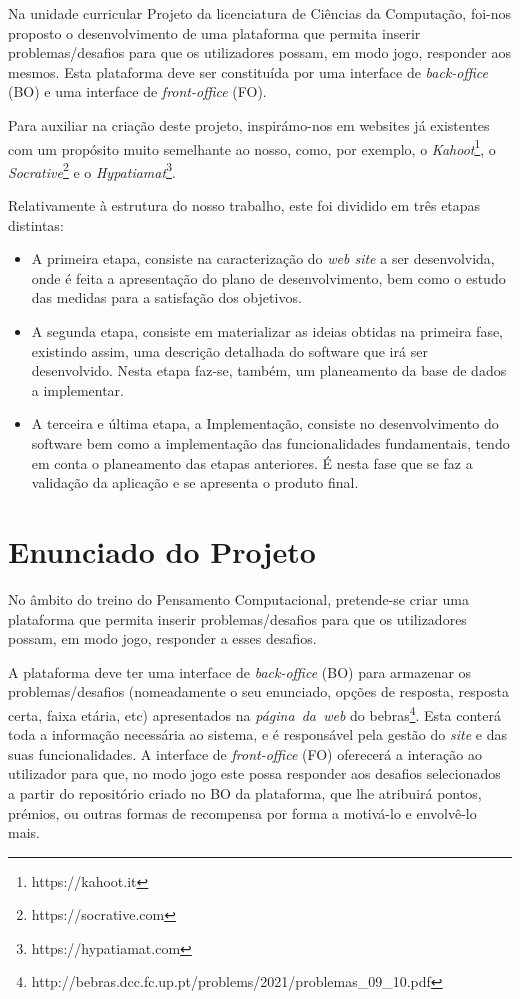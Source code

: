 \documentclass[11pt,a4paper]{report}
\begin{document}
Na unidade curricular Projeto da licenciatura de Ciências da Computação, foi-nos proposto o desenvolvimento de uma plataforma que permita inserir problemas/desafios para que os utilizadores possam, em modo jogo, responder aos mesmos. Esta plataforma deve ser constituída por uma interface de \emph{back-office} (BO) e uma interface de \emph{front-office} (FO).

Para auxiliar na criação deste projeto, inspirámo-nos em websites já existentes com um propósito muito semelhante ao nosso, como, por exemplo, o \emph{Kahoot}\footnote{https://kahoot.it}, o \emph{Socrative}\footnote{https://socrative.com} e o \emph{Hypatiamat}\footnote{https://hypatiamat.com}.

Relativamente à estrutura do nosso trabalho, este foi dividido em três etapas distintas:
\begin{itemize}
   \item A primeira etapa, consiste na caracterização do \emph{web site} a ser desenvolvida, onde é feita a apresentação do plano de desenvolvimento, bem como o estudo das medidas para a satisfação dos objetivos.
   \item A segunda etapa, consiste em materializar as ideias obtidas na primeira fase, existindo assim, uma descrição detalhada do software que irá ser desenvolvido. Nesta etapa faz-se, também, um planeamento da base de dados a implementar.
   \item A terceira e última etapa, a Implementação, consiste no desenvolvimento do software bem como a implementação das funcionalidades fundamentais, tendo em conta o planeamento das etapas anteriores. É nesta fase que se faz a validação da aplicação e se apresenta o produto final.
\end{itemize}

\chapter{Enunciado do Projeto}

No âmbito do treino do Pensamento Computacional, pretende-se criar uma plataforma que permita inserir problemas/desafios para que os utilizadores possam, em modo jogo, responder a esses desafios. 

A plataforma deve ter uma interface de \emph{back-office} (BO) para armazenar os problemas/desafios (nomeadamente o seu enunciado, opções de resposta, resposta certa, faixa etária, etc) apresentados na \emph{página\ da\ web} do bebras\footnote{http://bebras.dcc.fc.up.pt/problems/2021/problemas\_09\_10.pdf}. Esta conterá toda a informação necessária ao sistema, e é responsável pela gestão do \emph{site} e das suas funcionalidades. A interface de \emph{front-office} (FO) oferecerá a interação ao utilizador para que, no modo jogo este possa responder aos desafios selecionados a partir do repositório criado no BO da plataforma, que lhe atribuirá pontos, prémios, ou outras formas de recompensa por forma a motivá-lo e envolvê-lo mais.
\end{document}
